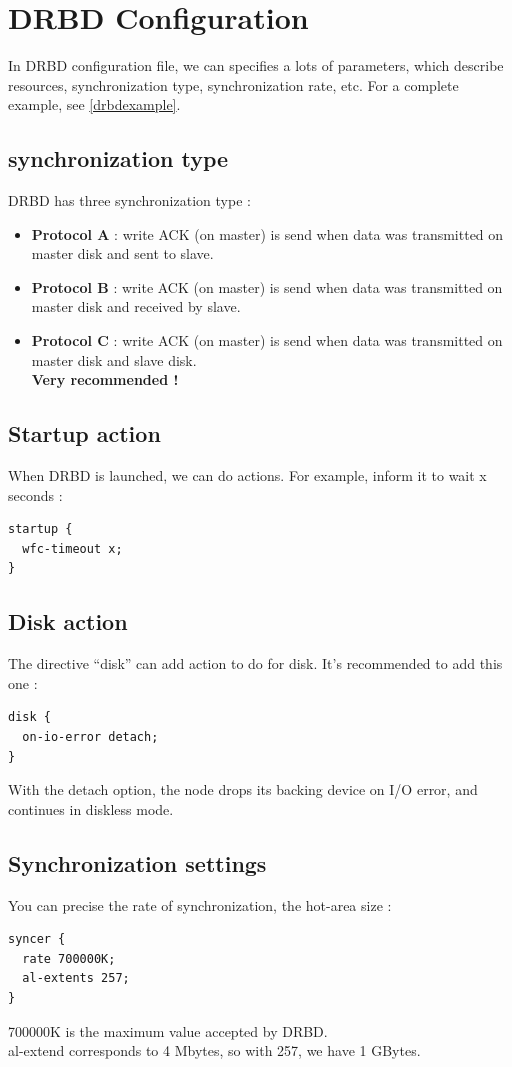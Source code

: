 \documentclass[a4paper,10pt]{report}
\begin{document}
\section{DRBD Configuration}
In DRBD configuration file, we can specifies a lots of parameters, which describe resources, synchronization type, synchronization rate, etc. For a complete example, see \ref{drbdexample}.
\subsection{synchronization type}
DRBD has three synchronization type :
\begin{itemize}
\item \textbf{Protocol A} : write ACK (on master) is send when data was transmitted on master disk and sent to slave.
\item \textbf{Protocol B} : write ACK (on master) is send when data was transmitted on master disk and received by slave.
\item \textbf{Protocol C} : write ACK (on master) is send when data was transmitted on master disk and slave disk.\\
\textbf{Very recommended !}
\end{itemize}

\subsection{Startup action}
When DRBD is launched, we can do actions. For example, inform it to wait x seconds :
\begin{lstlisting}
startup {
  wfc-timeout x;
}
\end{lstlisting}

\subsection{Disk action}
The directive ``disk'' can add action to do for disk. It's recommended to add this one :
\begin{lstlisting}
disk {
  on-io-error detach;
}
\end{lstlisting}
With the detach option, the node drops its backing device on I/O error, and continues in diskless mode.

\subsection{Synchronization settings}
You can precise the rate of synchronization, the hot-area size :
\begin{lstlisting}
syncer {
  rate 700000K;
  al-extents 257;
}
\end{lstlisting}
700000K is the maximum value accepted by DRBD.\\
al-extend corresponds to 4 Mbytes, so with 257, we have 1 GBytes.
\end{document}
